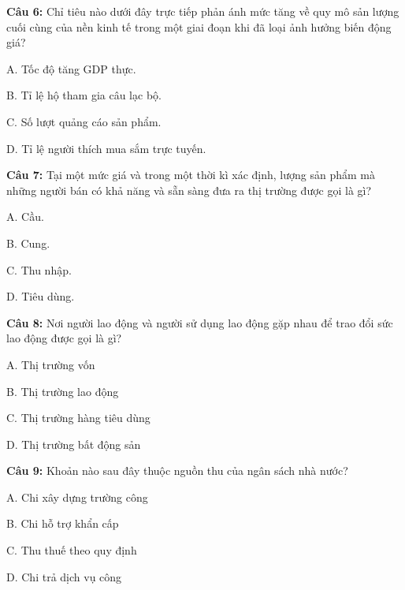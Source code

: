 \documentclass[12pt,a4paper]{article}
\begin{document}
\par\noindent\begin{minipage}{\linewidth}
\noindent\textbf{Câu 6:} Chỉ tiêu nào dưới đây trực tiếp phản ánh mức tăng về quy mô sản lượng cuối cùng của nền kinh tế trong một giai đoạn khi đã loại ảnh hưởng biến động giá?\par
\noindent A. Tốc độ tăng GDP thực.\par
\noindent B. Tỉ lệ hộ tham gia câu lạc bộ.\par
\noindent C. Số lượt quảng cáo sản phẩm.\par
\noindent D. Tỉ lệ người thích mua sắm trực tuyến.\par
\end{minipage}\par\vspace{0.12cm}

\par\noindent\begin{minipage}{\linewidth}
\noindent\textbf{Câu 7:} Tại một mức giá và trong một thời kì xác định, lượng sản phẩm mà những người bán có khả năng và sẵn sàng đưa ra thị trường được gọi là gì?\par
\noindent A. Cầu.\par
\noindent B. Cung.\par
\noindent C. Thu nhập.\par
\noindent D. Tiêu dùng.\par
\end{minipage}\par\vspace{0.12cm}

\par\noindent\begin{minipage}{\linewidth}
\noindent\textbf{Câu 8:} Nơi người lao động và người sử dụng lao động gặp nhau để trao đổi sức lao động được gọi là gì?\par
\noindent A. Thị trường vốn\par
\noindent B. Thị trường lao động\par
\noindent C. Thị trường hàng tiêu dùng\par
\noindent D. Thị trường bất động sản\par
\end{minipage}\par\vspace{0.12cm}

\par\noindent\begin{minipage}{\linewidth}
\noindent\textbf{Câu 9:} Khoản nào sau đây thuộc nguồn thu của ngân sách nhà nước?\par
\noindent A. Chi xây dựng trường công\par
\noindent B. Chi hỗ trợ khẩn cấp\par
\noindent C. Thu thuế theo quy định\par
\noindent D. Chi trả dịch vụ công\par
\end{minipage}\par\vspace{0.12cm}
\end{document}
